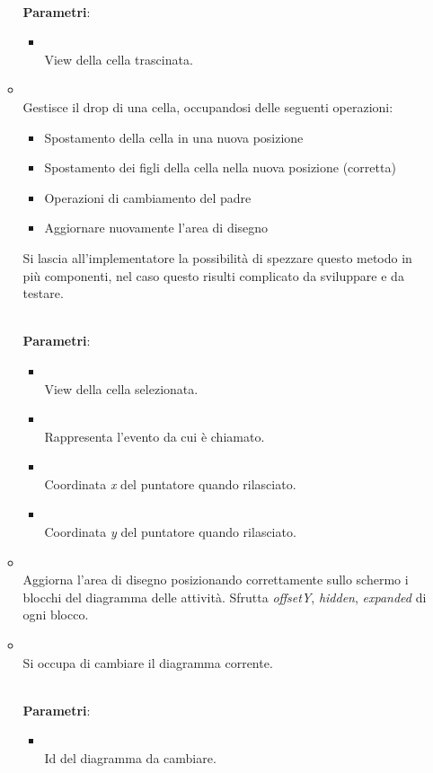 \begin{itemize}
\begin{itemize}
\\ \textbf{Parametri}:
\begin{itemize}
\item {}
\\ View della cella trascinata.

\end{itemize}
\item {}
\\ Gestisce il drop di una cella, occupandosi delle seguenti operazioni: \begin{itemize} \item Spostamento della cella in una nuova posizione \item Spostamento dei figli della cella nella nuova posizione (corretta) \item Operazioni di cambiamento del padre \item Aggiornare nuovamente l'area di disegno \end{itemize} Si lascia all'implementatore la possibilità di spezzare questo metodo in più componenti, nel caso questo risulti complicato da sviluppare e da testare.	

\\ \textbf{Parametri}:
\begin{itemize}
\item {}
\\ View della cella selezionata.
\item {}
\\ Rappresenta l'evento da cui è chiamato.
\item {}
\\ Coordinata \emph{x} del puntatore quando rilasciato.
\item {}
\\ Coordinata \emph{y} del puntatore quando rilasciato.
\end{itemize}
\item {}
\\ Aggiorna l'area di disegno posizionando correttamente sullo schermo i blocchi del diagramma delle attività. Sfrutta \emph{offsetY}, \emph{hidden}, \emph{expanded} di ogni blocco.	

\item {}
\\ Si occupa di cambiare il diagramma corrente.	

\\ \textbf{Parametri}:
\begin{itemize}
\item {}
\\ Id del diagramma da cambiare.
\end{itemize}
\end{itemize}
\end{itemize}
